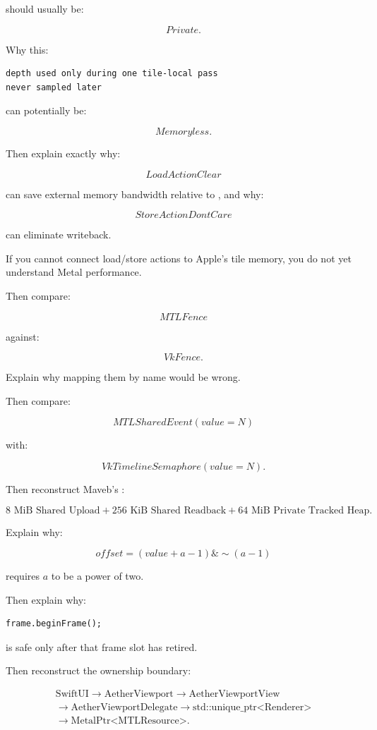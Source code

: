 should usually be:

\[
Private.
\]

Why this:

\begin{verbatim}
depth used only during one tile-local pass
never sampled later
\end{verbatim}

can potentially be:

\[
Memoryless.
\]

Then explain exactly why:

\[
LoadActionClear
\]

can save external memory bandwidth relative to , and why:

\[
StoreActionDontCare
\]

can eliminate writeback.

If you cannot connect load/store actions to Apple's tile memory, you do not yet understand Metal performance.

Then compare:

\[
MTLFence
\]

against:

\[
VkFence.
\]

Explain why mapping them by name would be wrong.

Then compare:

\[
MTLSharedEvent(value=N)
\]

with:

\[
VkTimelineSemaphore(value=N).
\]

Then reconstruct Maveb's :

\[
8\text{ MiB Shared Upload}
+
256\text{ KiB Shared Readback}
+
64\text{ MiB Private Tracked Heap}.
\]

Explain why:

\[
offset=
(value+a-1)\&
\sim(a-1)
\]

requires \(a\) to be a power of two.

Then explain why:

\begin{verbatim}
frame.beginFrame();
\end{verbatim}

is safe only after that frame slot has retired.

Then reconstruct the ownership boundary:

\[\begin{gathered}\text{SwiftUI}\rightarrow\text{AetherViewport}\rightarrow\text{AetherViewportView}\\\rightarrow\text{AetherViewportDelegate}\rightarrow\text{std::unique\_ptr<Renderer>}\\\rightarrow\text{MetalPtr<MTLResource>}.\end{gathered}\]

